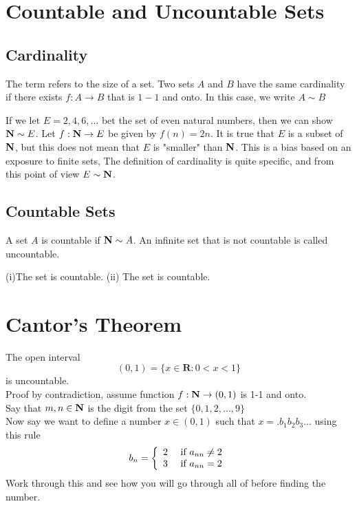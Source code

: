 \section{Countable and Uncountable Sets}
\subsection{Cardinality}
The term  refers to the size of a set. 
\indent Two sets $ A $ and $ B $ have the same cardinality if there exists $ f: A \rightarrow B $ that is $ 1-1 $ and onto. In this case, we write $ A \sim B $\\

\begin{example}
	If we let $ E = {2,4,6,...} $ bet the set of even natural numbers, then we can show $ \textbf{N} \sim E $. Let $ f: \textbf{N} \rightarrow E $ be given by $ f(n) = 2n $. It is true that $ E $ is a subset of $ \textbf{N} $, but this does not mean that $ E $ is "smaller" than $ \textbf{N} $. This is a bias based on an exposure to finite sets, The definition of cardinality is quite specific, and from this point of view $ E \sim \textbf{N} $.
\end{example}
\subsection{Countable Sets}
A set $ A $ is countable if $ \textbf{N} \sim A $. An infinite set that is not countable is called uncountable. 
\begin{theorem}
	(i)The set \Q is countable. (ii) The set \R is countable. 
\end{theorem}
\section{Cantor's Theorem}
\begin{theorem}
	The open interval \[ ( 0,1 ) = \{ x \in \mathbf { R } : 0 < x < 1 \} \] is uncountable. \\
	Proof by contradiction,  assume function $ f:\textbf{N} \rightarrow (0,1) $ is 1-1 and onto. \\
	Say that $ m, n \in \textbf{N} $ is the digit from the set $ \{0,1,2,...,9\} $ \\
	Now say we want to define a number $ x \in (0,1) $ such that $ x = .b_1b_2b_3... $ using this rule
	\[ b _ { n } = \left\{ \begin{array} { l l } { 2 } & { \text { if } a _ { n n } \neq 2 } \\ { 3 } & { \text { if } a _ { n n } = 2 } \end{array} \right. \]
	Work through this and see how you will go through all of \N before finding the number. 
\end{theorem}
